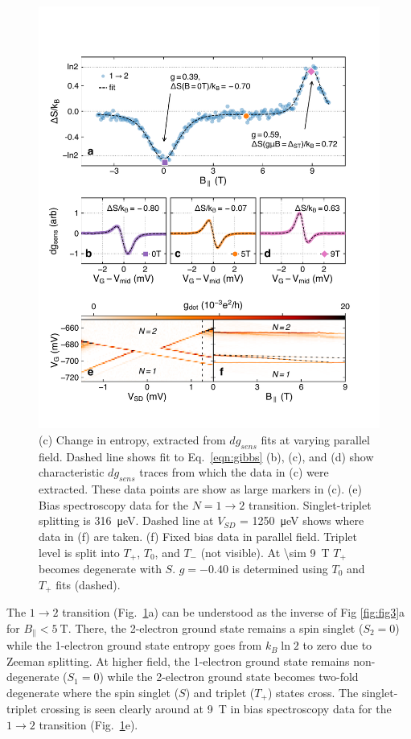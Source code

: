 \documentclass[twocolumn,showpacs,amsmath,amssymb,prl,aps,superscriptaddress]{revtex4-1}
\begin{document}
\begin{figure}
        \includegraphics[width=1.0\columnwidth]{../figures/figure_4.pdf}
        \caption{\label{fig:fig4}(c) Change in entropy, extracted from $dg_{sens}$ fits at varying parallel field. Dashed line shows fit to Eq.~\ref{eqn:gibbs} (b), (c), and (d) show characteristic $dg_{sens}$ traces from which the data in (c) were extracted. These data points are show as large markers in (c). (e) Bias spectroscopy data for the $N=1 \rightarrow 2$ transition. Singlet-triplet splitting is \SI{316}{\micro\electronvolt}. Dashed line at $V_{SD}$ = \SI{1250}{\micro\electronvolt} shows where data in (f) are taken. (f) Fixed bias data in parallel field. Triplet level is split into $T_+$, $T_0$, and $T_{-}$ (not visible). At \SI[input-protect-tokens]{\sim 9}{\tesla} $T_+$ becomes degenerate with $S$. $g=-0.40$ is determined using $T_0$ and $T_+$ fits (dashed).}
\end{figure}

The $1\rightarrow 2$ transition (Fig.~\ref{fig:fig4}a) can be understood as the inverse of Fig \ref{fig:fig3}a for $B_\parallel < \SI{5}{\tesla}$.  There, the 2-electron ground state remains a spin singlet ($S_2=0$) while the 1-electron ground state entropy goes from $k_B\ln{2}$ to zero due to Zeeman splitting. At higher field, the 1-electron ground state remains non-degenerate ($S_1=0$) while the 2-electron ground state becomes two-fold degenerate where the spin singlet ($S$) and triplet ($T_+$) states cross. The singlet-triplet crossing is seen clearly around at \SI{9}{\tesla} in bias spectroscopy data for the $1\rightarrow 2$ transition (Fig.~\ref{fig:fig4}e). 
\end{document}
